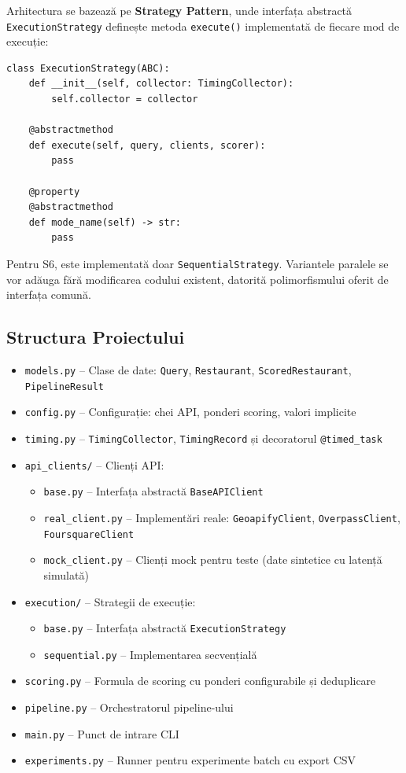 \documentclass[12pt,a4paper]{article}
\begin{document}
Arhitectura se bazează pe \textbf{Strategy Pattern}, unde interfața abstractă \texttt{ExecutionStrategy} definește metoda \texttt{execute()} implementată de fiecare mod de execuție:

\begin{lstlisting}[caption={Interfața ExecutionStrategy}]
class ExecutionStrategy(ABC):
    def __init__(self, collector: TimingCollector):
        self.collector = collector

    @abstractmethod
    def execute(self, query, clients, scorer):
        pass

    @property
    @abstractmethod
    def mode_name(self) -> str:
        pass
\end{lstlisting}

Pentru S6, este implementată doar \texttt{SequentialStrategy}. Variantele paralele se vor adăuga fără modificarea codului existent, datorită polimorfismului oferit de interfața comună.

\subsection{Structura Proiectului}

\begin{itemize}
    \item \texttt{models.py} -- Clase de date: \texttt{Query}, \texttt{Restaurant}, \texttt{ScoredRestaurant}, \texttt{PipelineResult}
    \item \texttt{config.py} -- Configurație: chei API, ponderi scoring, valori implicite
    \item \texttt{timing.py} -- \texttt{TimingCollector}, \texttt{TimingRecord} și decoratorul \texttt{@timed\_task}
    \item \texttt{api\_clients/} -- Clienți API:
    \begin{itemize}
        \item \texttt{base.py} -- Interfața abstractă \texttt{BaseAPIClient}
        \item \texttt{real\_client.py} -- Implementări reale: \texttt{GeoapifyClient}, \texttt{OverpassClient}, \texttt{FoursquareClient}
        \item \texttt{mock\_client.py} -- Clienți mock pentru teste (date sintetice cu latență simulată)
    \end{itemize}
    \item \texttt{execution/} -- Strategii de execuție:
    \begin{itemize}
        \item \texttt{base.py} -- Interfața abstractă \texttt{ExecutionStrategy}
        \item \texttt{sequential.py} -- Implementarea secvențială
    \end{itemize}
    \item \texttt{scoring.py} -- Formula de scoring cu ponderi configurabile și deduplicare
    \item \texttt{pipeline.py} -- Orchestratorul pipeline-ului
    \item \texttt{main.py} -- Punct de intrare CLI
    \item \texttt{experiments.py} -- Runner pentru experimente batch cu export CSV
\end{itemize}
\end{document}
